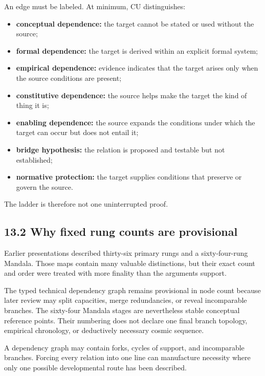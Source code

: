 \documentclass[
  11pt,
]{article}
\providecommand{\tightlist}{%
  \setlength{\itemsep}{0pt}\setlength{\parskip}{0pt}}
\begin{document}
An edge must be labeled. At minimum, CU distinguishes:

\begin{itemize}
\tightlist
\item
  \textbf{conceptual dependence:} the target cannot be stated or used
  without the source;
\item
  \textbf{formal dependence:} the target is derived within an explicit
  formal system;
\item
  \textbf{empirical dependence:} evidence indicates that the target
  arises only when the source conditions are present;
\item
  \textbf{constitutive dependence:} the source helps make the target the
  kind of thing it is;
\item
  \textbf{enabling dependence:} the source expands the conditions under
  which the target can occur but does not entail it;
\item
  \textbf{bridge hypothesis:} the relation is proposed and testable but
  not established;
\item
  \textbf{normative protection:} the target supplies conditions that
  preserve or govern the source.
\end{itemize}

The ladder is therefore not one uninterrupted proof.

\subsection{13.2 Why fixed rung counts are
provisional}\label{why-fixed-rung-counts-are-provisional}

Earlier presentations described thirty-six primary rungs and a
sixty-four-rung Mandala. Those maps contain many valuable distinctions,
but their exact count and order were treated with more finality than the
arguments support.

The typed technical dependency graph remains provisional in node count
because later review may split capacities, merge redundancies, or reveal
incomparable branches. The sixty-four Mandala stages are nevertheless
stable conceptual reference points. Their numbering does not declare one
final branch topology, empirical chronology, or deductively necessary
cosmic sequence.

A dependency graph may contain forks, cycles of support, and
incomparable branches. Forcing every relation into one line can
manufacture necessity where only one possible developmental route has
been described.
\end{document}
